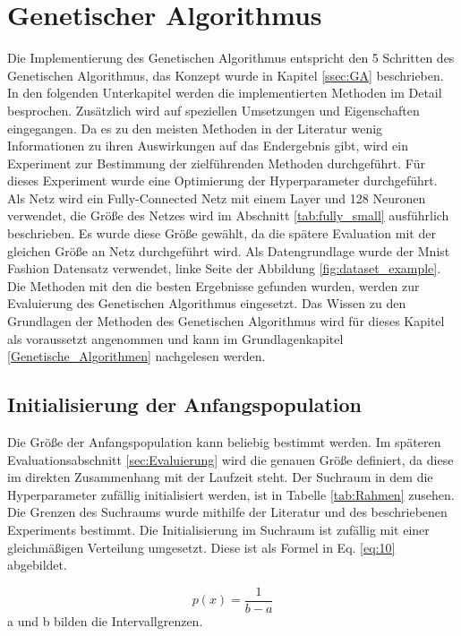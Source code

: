 \section{Genetischer Algorithmus} \label{ssec:implementierung}
Die Implementierung des Genetischen Algorithmus entspricht den 5 Schritten des Genetischen Algorithmus, das Konzept wurde in Kapitel \ref{ssec:GA} beschrieben. In den folgenden Unterkapitel werden die implementierten Methoden im Detail besprochen. Zusätzlich wird auf speziellen Umsetzungen und Eigenschaften eingegangen. Da es zu den meisten Methoden in der Literatur wenig Informationen zu ihren Auswirkungen auf das Endergebnis gibt, wird ein Experiment zur Bestimmung der zielführenden Methoden durchgeführt. Für dieses Experiment wurde eine Optimierung der Hyperparameter durchgeführt. Als Netz wird ein Fully-Connected Netz mit einem Layer und 128 Neuronen verwendet, die Größe des Netzes wird im Abschnitt \ref{tab:fully_small} ausführlich beschrieben. Es wurde diese Größe gewählt, da die spätere Evaluation mit der gleichen Größe an Netz durchgeführt wird. Als Datengrundlage wurde der Mnist Fashion Datensatz verwendet, linke Seite der Abbildung \ref{fig:dataset_example}. Die Methoden mit den die besten Ergebnisse gefunden wurden, werden zur Evaluierung des Genetischen Algorithmus eingesetzt. Das Wissen zu den Grundlagen der Methoden des Genetischen Algorithmus wird für dieses Kapitel als voraussetzt angenommen und kann im Grundlagenkapitel \ref{Genetische_Algorithmen} nachgelesen werden.

\newpage

\subsection{Initialisierung der Anfangspopulation} \label{implementierung_init}
Die Größe der Anfangspopulation kann beliebig bestimmt werden. Im späteren Evaluationsabschnitt \ref{sec:Evaluierung} wird die genauen Größe definiert, da diese im direkten Zusammenhang mit der Laufzeit steht. Der Suchraum in dem die Hyperparameter zufällig initialisiert werden, ist in Tabelle \ref{tab:Rahmen} zusehen. Die Grenzen des Suchraums wurde mithilfe der Literatur und des beschriebenen Experiments bestimmt. Die Initialisierung im Suchraum ist zufällig mit einer gleichmäßigen Verteilung umgesetzt. Diese ist als Formel in Eq. \ref{eq:10} abgebildet.

\begin{equation}
	p(x) = \frac{1}{b - a}  \label{eq:10}
\end{equation}
a und b bilden die Intervallgrenzen.

